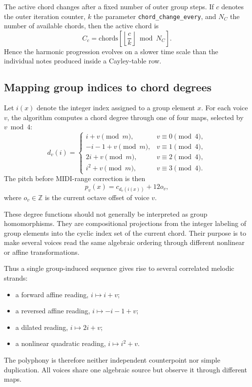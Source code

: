 \documentclass[11pt,a4paper]{article}
\newcommand{\Z}{\mathbb{Z}}
\begin{document}
The active chord changes after a fixed number of outer group steps. If $c$ denotes the outer iteration counter, $k$ the parameter \texttt{chord\_change\_every}, and $N_C$ the number of available chords, then the active chord is
\[
C_c
=
\text{chords}\left[
\left\lfloor\frac{c}{k}\right\rfloor \bmod N_C
\right].
\]
Hence the harmonic progression evolves on a slower time scale than the individual notes produced inside a Cayley-table row.

\subsection{Mapping group indices to chord degrees}

Let $i(x)$ denote the integer index assigned to a group element $x$. For each voice $v$, the algorithm computes a chord degree through one of four maps, selected by $v\bmod 4$:
\[
d_v(i)=
\begin{cases}
 i+v \pmod m, & v\equiv 0 \pmod 4,\\[0.4em]
 -i-1+v \pmod m, & v\equiv 1 \pmod 4,\\[0.4em]
 2i+v \pmod m, & v\equiv 2 \pmod 4,\\[0.4em]
 i^2+v \pmod m, & v\equiv 3 \pmod 4.
\end{cases}
\]
The pitch before MIDI-range correction is then
\[
p_v(x)=c_{d_v(i(x))}+12o_v,
\]
where $o_v\in\Z$ is the current octave offset of voice $v$.

These degree functions should not generally be interpreted as group homomorphisms. They are compositional projections from the integer labeling of group elements into the cyclic index set of the current chord. Their purpose is to make several voices read the same algebraic ordering through different nonlinear or affine transformations.

Thus a single group-induced sequence gives rise to several correlated melodic strands:
\begin{itemize}[leftmargin=1.5em]
    \item a forward affine reading, $i\mapsto i+v$;
    \item a reversed affine reading, $i\mapsto -i-1+v$;
    \item a dilated reading, $i\mapsto 2i+v$;
    \item a nonlinear quadratic reading, $i\mapsto i^2+v$.
\end{itemize}

The polyphony is therefore neither independent counterpoint nor simple duplication. All voices share one algebraic source but observe it through different maps.
\end{document}
